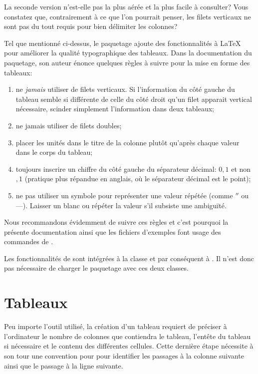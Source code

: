 La seconde version n'est-elle pas la plus aérée et la plus facile à
consulter? Vous constatez que, contrairement à ce que l'on pourrait
penser, les filets verticaux ne sont pas du tout requis pour bien
délimiter les colonnes?

Tel que mentionné ci-dessus, le paquetage  ajoute des
fonctionnalités à {\LaTeX} pour améliorer la qualité typographique des
tableaux. Dans la documentation du paquetage, son auteur énonce
quelques règles à suivre pour la mise en forme des tableaux:
\begin{enumerate}
\item ne \emph{jamais} utiliser de filets verticaux. Si l'information du côté
  gauche du tableau semble si différente de celle du côté droit
  qu'un filet apparait vertical nécessaire, scinder simplement
  l'information dans deux tableaux;
\item ne jamais utiliser de filets doubles;
\item placer les unités dans le titre de la colonne plutôt qu'après
  chaque valeur dans le corps du tableau;
\item toujours inscrire un chiffre du côté gauche du séparateur
  décimal: $0,1$ et non $,1$ (pratique plus répandue en anglais, où le
  séparateur décimal est le point);
\item ne pas utiliser un symbole pour représenter une valeur
  répétée (comme $''$ ou ---). Laisser un blanc ou répéter la
  valeur s'il subsiste une ambiguïté.
\end{enumerate}

Nous recommandons évidemment de suivre ces règles et c'est pourquoi la
présente documentation ainsi que les fichiers d'exemples font usage
des commandes de .

Les fonctionnalités de  sont intégrées à la classe
 et par conséquent à . Il n'est donc pas
nécessaire de charger le paquetage avec ces deux classes.



\section{Tableaux}
\label{sec:tableaux:tableaux}

Peu importe l'outil utilisé, la création d'un tableau requiert de
préciser à l'ordinateur le nombre de colonnes que contiendra le
tableau, l'entête du tableau si nécessaire et le contenu des
différentes cellules. Cette dernière étape nécessite à son tour une
convention pour pour identifier les passages à la colonne suivante
ainsi que le passage à la ligne suivante.

